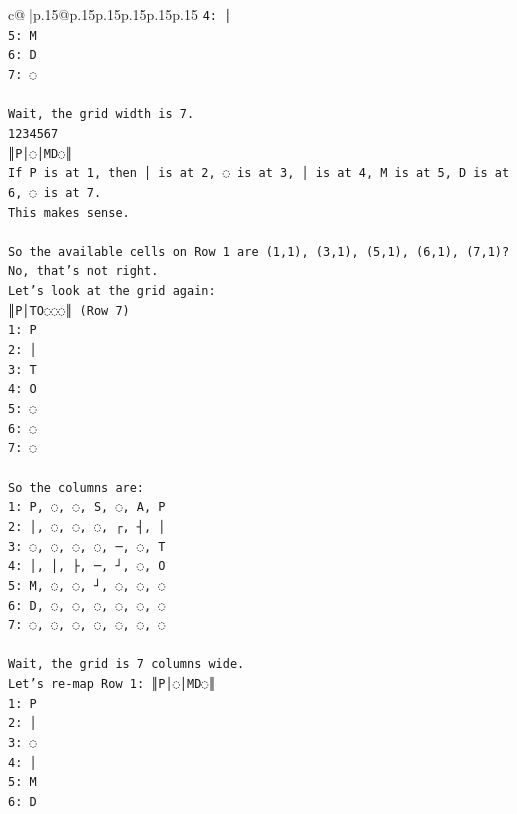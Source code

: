 \documentclass{article}
\begin{document}
{\begin{supertabular}{c@{$\;$}|p{.15\linewidth}@{}p{.15\linewidth}p{.15\linewidth}p{.15\linewidth}p{.15\linewidth}p{.15\linewidth}}
{{{\texttt{4: │} \\
\texttt{5: M} \\
\texttt{6: D} \\
\texttt{7: ◌} \\
\\ 
\texttt{Wait, the grid width is 7.} \\
\texttt{1234567} \\
\texttt{║P│◌│MD◌║} \\
\texttt{If P is at 1, then │ is at 2, ◌ is at 3, │ is at 4, M is at 5, D is at 6, ◌ is at 7.} \\
\texttt{This makes sense.} \\
\\ 
\texttt{So the available cells on Row 1 are (1,1), (3,1), (5,1), (6,1), (7,1)? No, that's not right.} \\
\texttt{Let's look at the grid again:} \\
\texttt{║P│TO◌◌◌║ (Row 7)} \\
\texttt{1: P} \\
\texttt{2: │} \\
\texttt{3: T} \\
\texttt{4: O} \\
\texttt{5: ◌} \\
\texttt{6: ◌} \\
\texttt{7: ◌} \\
\\ 
\texttt{So the columns are:} \\
\texttt{1: P, ◌, ◌, S, ◌, A, P} \\
\texttt{2: │, ◌, ◌, ◌, ┌, ┤, │} \\
\texttt{3: ◌, ◌, ◌, ◌, ─, ◌, T} \\
\texttt{4: │, │, ├, ─, ┘, ◌, O} \\
\texttt{5: M, ◌, ◌, ┘, ◌, ◌, ◌} \\
\texttt{6: D, ◌, ◌, ◌, ◌, ◌, ◌} \\
\texttt{7: ◌, ◌, ◌, ◌, ◌, ◌, ◌} \\
\\ 
\texttt{Wait, the grid is 7 columns wide.} \\
\texttt{Let's re{-}map Row 1: ║P│◌│MD◌║} \\
\texttt{1: P} \\
\texttt{2: │} \\
\texttt{3: ◌} \\
\texttt{4: │} \\
\texttt{5: M} \\
\texttt{6: D} \\
}}}
\end{supertabular}}
\end{document}
